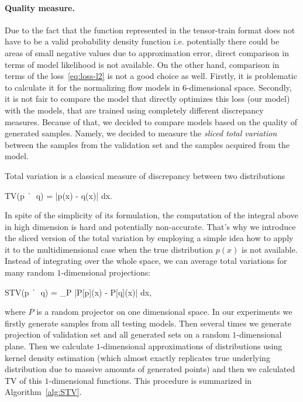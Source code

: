 \documentclass[accepted]{uai2021}
\DeclareMathOperator{\E}{\mathop{\mathbb{E}}}
\renewcommand\vec{\boldsymbol}
\begin{document}
  \paragraph{Quality measure.}
  Due to the fact that the function represented in the tensor-train format does not have to be a valid probability density function i.e. potentially there could be areas of small negative values due to approximation error, direct comparison in terms of model likelihood is not available. On the other hand, comparison in terms of the loss~\eqref{eq:loss-l2} is not a good choice as well. Firstly, it is problematic to calculate it for the normalizing flow models in $6$-dimensional space. Secondly, it is not fair to compare the model that directly optimizes this loss (our model) with the models, that are trained using completely different discrepancy measures. Because of that, we decided to compare models based on the quality of generated samples. Namely, we decided to measure the \emph{sliced total variation} between the samples from the validation set and the samples acquired from the model.

  Total variation is a classical measure of discrepancy between two distributions
  \begin{EQA}[l]
    TV(p ~\|~ q) = \int \bigl|p(x) - q(x)\bigr| dx.
  \end{EQA}
  In spite of the simplicity of its formulation, the computation of the integral above in high dimension is hard and potentially non-accurate. That's why we introduce the sliced version of the total variation by employing a simple idea how to apply it to the multidimensional case when the true distribution $p(x)$ is not available. Instead of integrating over the whole space, we can average total variations for many random $1$-dimensional projections:%
  \begin{EQA}[l]
    STV(p ~\|~ q) = \E_{P} \int \bigl|P[p](x) - P[q](x)\bigr| dx,
  \end{EQA}
  where $P$ is a random projector on one dimensional space.
  In our experiments we firstly generate samples from all testing models. Then several times we generate projection of validation set and all generated sets on a random $1$-dimensional plane. Then we calculate $1$-dimensional approximations of distributions using kernel density estimation (which almost exactly replicates true underlying distribution due to massive amounts of generated points) and then we calculated TV of this $1$-dimensional functions. This procedure is summarized in Algorithm~\ref{alg:STV}.
\end{document}
